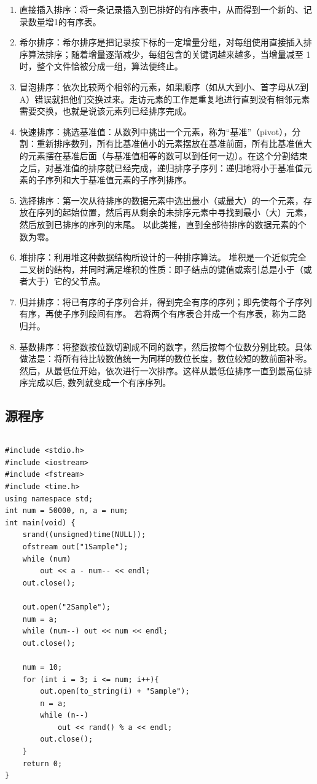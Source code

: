 \documentclass[a4paper,11pt,UTF8]{ctexart}
\begin{document}
\begin{enumerate}
	\item 直接插入排序：将一条记录插入到已排好的有序表中，从而得到一个新的、记录数量增1的有序表。
	\item 希尔排序：希尔排序是把记录按下标的一定增量分组，对每组使用直接插入排序算法排序；随着增量逐渐减少，每组包含的关键词越来越多，当增量减至 1 时，整个文件恰被分成一组，算法便终止。
	\item 冒泡排序：依次比较两个相邻的元素，如果顺序（如从大到小、首字母从Z到A）错误就把他们交换过来。走访元素的工作是重复地进行直到没有相邻元素需要交换，也就是说该元素列已经排序完成。
	\item 快速排序：挑选基准值：从数列中挑出一个元素，称为“基准”（pivot），分割：重新排序数列，所有比基准值小的元素摆放在基准前面，所有比基准值大的元素摆在基准后面（与基准值相等的数可以到任何一边）。在这个分割结束之后，对基准值的排序就已经完成，递归排序子序列：递归地将小于基准值元素的子序列和大于基准值元素的子序列排序。
	\item 选择排序：第一次从待排序的数据元素中选出最小（或最大）的一个元素，存放在序列的起始位置，然后再从剩余的未排序元素中寻找到最小（大）元素，然后放到已排序的序列的末尾。 以此类推，直到全部待排序的数据元素的个数为零。
	\item 堆排序：利用堆这种数据结构所设计的一种排序算法。 堆积是一个近似完全二叉树的结构，并同时满足堆积的性质：即子结点的键值或索引总是小于（或者大于）它的父节点。
	\item 归并排序：将已有序的子序列合并，得到完全有序的序列；即先使每个子序列有序，再使子序列段间有序。 若将两个有序表合并成一个有序表，称为二路归并。
	\item 基数排序：将整数按位数切割成不同的数字，然后按每个位数分别比较。具体做法是：将所有待比较数值统一为同样的数位长度，数位较短的数前面补零。然后，从最低位开始，依次进行一次排序。这样从最低位排序一直到最高位排序完成以后, 数列就变成一个有序序列。
\end{enumerate}\par

\subsection{源程序}

\begin{lstlisting}[caption=Sort.cpp,captionpos=b]

\end{lstlisting}

\begin{lstlisting}[caption=NumGeneration.cpp,captionpos=b]
#include <stdio.h>
#include <iostream>
#include <fstream>
#include <time.h>
using namespace std;
int num = 50000, n, a = num;
int main(void) {
    srand((unsigned)time(NULL));
    ofstream out("1Sample");
    while (num)
        out << a - num-- << endl;
    out.close();

    out.open("2Sample");
    num = a;
    while (num--) out << num << endl;
    out.close();

    num = 10;
    for (int i = 3; i <= num; i++){
        out.open(to_string(i) + "Sample");
        n = a;
        while (n--)
            out << rand() % a << endl;
        out.close();
    }
    return 0;
}
\end{lstlisting}
\end{document}

